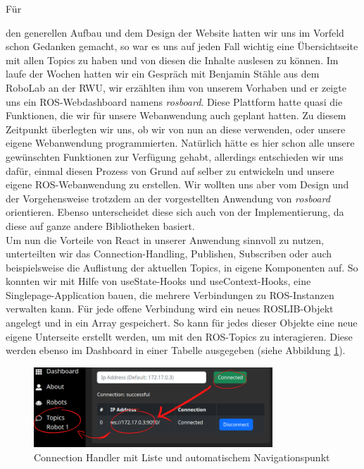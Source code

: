 \begin{flushleft}
\hypertarget{rosboard-target}{Für} den generellen Aufbau und dem Design der Website hatten wir uns im Vorfeld schon Gedanken gemacht, so war es uns auf jeden Fall wichtig eine Übersichtseite mit allen Topics zu haben und von diesen die Inhalte auslesen zu können.
Im laufe der Wochen hatten wir ein Gespräch mit Benjamin Stähle aus dem RoboLab an der RWU, wir erzählten ihm von unserem Vorhaben und er zeigte uns ein ROS-Webdashboard namens \textit{rosboard}.
Diese Plattform hatte quasi die Funktionen, die wir für unsere Webanwendung auch geplant hatten.
Zu diesem Zeitpunkt überlegten wir uns, ob wir von nun an diese verwenden, oder unsere eigene Webanwendung programmierten.
Natürlich hätte es hier schon alle unsere gewünschten Funktionen zur Verfügung gehabt, allerdings entschieden wir uns dafür, einmal diesen Prozess von Grund auf selber zu entwickeln und unsere eigene ROS-Webanwendung zu erstellen.
Wir wollten uns aber vom Design und der Vorgehensweise trotzdem an der vorgestellten Anwendung von \textit{rosboard} orientieren.
Ebenso unterscheidet diese sich auch von der Implementierung, da diese auf ganze andere Bibliotheken basiert.
\\

\vspace{0.5cm}
Um nun die Vorteile von React in unserer Anwendung sinnvoll zu nutzen, unterteilten wir das Connection-Handling, Publishen, Subscriben oder auch beispielsweise die Auflistung der aktuellen Topics, in eigene Komponenten auf.
So konnten wir mit Hilfe von useState-Hooks und useContext-Hooks, eine Singlepage-Application bauen, die mehrere Verbindungen zu ROS-Instanzen verwalten kann.
Für jede offene Verbindung wird ein neues ROSLIB-Objekt angelegt und in ein Array gespeichert.
So kann für jedes dieser Objekte eine neue eigene Unterseite erstellt werden, um mit den ROS-Topics zu interagieren. Diese werden ebenso im Dashboard in einer Tabelle ausgegeben (siehe Abbildung \ref{fig:ros_conn}).

\begin{figure}[h!]
    \centering
    \includegraphics[width=0.8\textwidth]{imgs/web/ros_conn.png}
    \caption{Connection Handler mit Liste und automatischem Navigationspunkt}
    \label{fig:ros_conn}%
\end{figure}


\end{flushleft}
